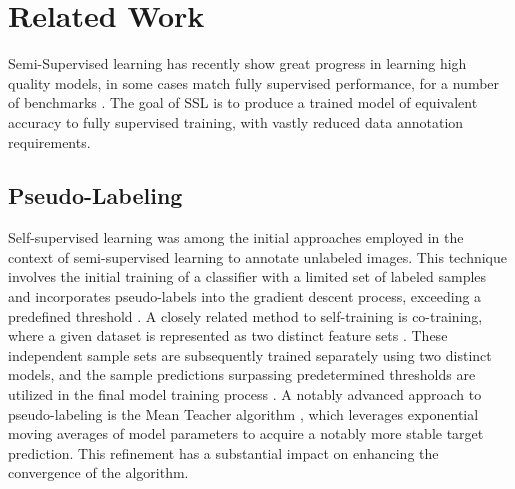 \documentclass[10pt,twocolumn,letterpaper]{article}
\begin{document}






\section{Related Work}



Semi-Supervised learning has recently show great progress in learning high quality models, in some cases match fully supervised performance, for a number of benchmarks \cite{zhang2021flexmatch}.
The goal of SSL is to produce a trained model of equivalent accuracy to fully supervised training, with vastly reduced data annotation requirements.

\subsection{Pseudo-Labeling}
Self-supervised learning was among the initial approaches employed in the context of semi-supervised learning to annotate unlabeled images. 
This technique involves the initial training of a classifier with a limited set of labeled samples and incorporates pseudo-labels into the gradient descent process, exceeding a predefined threshold \cite{yarowsky1995unsupervised, mcclosky2006reranking, olivier2006semi,zhai2019s4l,livieris2019predicting,rosenberg2005semi}. 
A closely related method to self-training is co-training, where a given dataset is represented as two distinct feature sets \cite{blum1998combining}. 
These independent sample sets are subsequently trained separately using two distinct models, and the sample predictions surpassing predetermined thresholds are utilized in the final model training process \cite{blum1998combining,prakash2014survey}.
A notably advanced approach to pseudo-labeling is the Mean Teacher algorithm \cite{tarvainen2017mean}, which leverages exponential moving averages of model parameters to acquire a notably more stable target prediction. 
This refinement has a substantial impact on enhancing the convergence of the algorithm.
\end{document}
